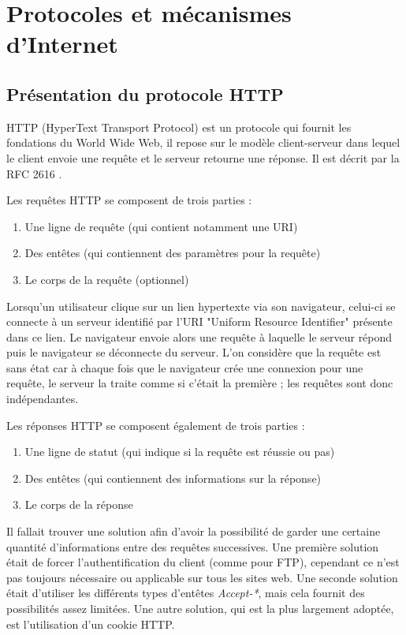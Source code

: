 \chapter{Protocoles et mécanismes d'Internet}

\section{Présentation du protocole HTTP}
HTTP (HyperText Transport Protocol) \cite{Obo_CNP3} est un protocole qui fournit les fondations du World Wide Web, il repose sur le modèle client-serveur dans lequel le client envoie une requête et le serveur retourne une réponse. Il est décrit par la RFC 2616 \cite{IETF_RFC2616}.
\newline

Les requêtes HTTP se composent de trois parties :
\begin{enumerate}
	\item Une ligne de requête (qui contient notamment une URI)
	\item Des entêtes (qui contiennent des paramètres pour la requête)
	\item Le corps de la requête (optionnel)
	\newline
\end{enumerate}

Lorsqu'un utilisateur clique sur un lien hypertexte via son navigateur, celui-ci se connecte à un serveur identifié par l'URI "Uniform Resource Identifier" présente dans ce lien. Le navigateur envoie alors une requête à laquelle le serveur répond puis le navigateur se déconnecte du serveur. L'on considère que la requête est sans état car à chaque fois que le navigateur crée une connexion pour une requête, le serveur la traite comme si c'était la première ; les requêtes sont donc indépendantes.
\newline

Les réponses HTTP se composent également de trois parties :
\begin{enumerate}
	\item Une ligne de statut (qui indique si la requête est réussie ou pas)
	\item Des entêtes (qui contiennent des informations sur la réponse)
	\item Le corps de la réponse
	\newline
\end{enumerate}

Il fallait trouver une solution afin d'avoir la possibilité de garder une certaine quantité d'informations entre des requêtes successives. Une première solution était de forcer l'authentification du client (comme pour FTP), cependant ce n'est pas toujours nécessaire ou applicable sur tous les sites web. Une seconde solution était d'utiliser les différents types d'entêtes \emph{Accept-*}, mais cela fournit des possibilités assez limitées. Une autre solution, qui est la plus largement adoptée, est l'utilisation d'un cookie HTTP.
\newline

